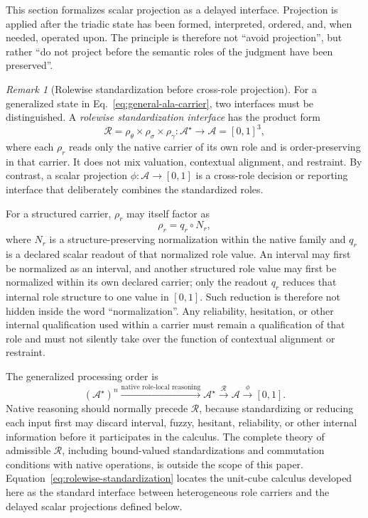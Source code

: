 \documentclass[reqno,final]{amsart}
\theoremstyle{definition}
\theoremstyle{plain}
\theoremstyle{remark}
\newtheorem{remark}{Remark}
\providecommand{\cA}{\mathcal{A}}
\begin{document}
This section formalizes scalar projection as a delayed interface. Projection is applied after the triadic state has been formed, interpreted, ordered, and, when needed, operated upon. The principle is therefore not ``avoid projection'', but rather ``do not project before the semantic roles of the judgment have been preserved''.

\begin{remark}[Rolewise standardization before cross-role projection]
\label{rem:rolewise-standardization}
For a generalized state in Eq.~\eqref{eq:general-ala-carrier}, two interfaces must be distinguished. A \emph{rolewise standardization interface} has the product form
\begin{equation}
\mathcal R
=
\rho_\theta\times\rho_\sigma\times\rho_\gamma:
\mathcal A^{\star}\longrightarrow\cA=[0,1]^3,
\label{eq:rolewise-standardization}
\end{equation}
where each \(\rho_r\) reads only the native carrier of its own role and is order-preserving in that carrier. It does not mix valuation, contextual alignment, and restraint. By contrast, a scalar projection \(\phi:\cA\to[0,1]\) is a cross-role decision or reporting interface that deliberately combines the standardized roles.

For a structured carrier, \(\rho_r\) may itself factor as
\[
\rho_r=q_r\circ N_r,
\]
where \(N_r\) is a structure-preserving normalization within the native family and \(q_r\) is a declared scalar readout of that normalized role value. An interval may first be normalized as an interval, and another structured role value may first be normalized within its own declared carrier; only the readout \(q_r\) reduces that internal role structure to one value in \([0,1]\). Such reduction is therefore not hidden inside the word ``normalization''. Any reliability, hesitation, or other internal qualification used within a carrier must remain a qualification of that role and must not silently take over the function of contextual alignment or restraint.

The generalized processing order is
\[
(\mathcal A^{\star})^n
\xrightarrow{\text{native role-local reasoning}}
\mathcal A^{\star}
\xrightarrow{\mathcal R}
\cA
\xrightarrow{\phi}
[0,1].
\]
Native reasoning should normally precede \(\mathcal R\), because standardizing or reducing each input first may discard interval, fuzzy, hesitant, reliability, or other internal information before it participates in the calculus. The complete theory of admissible \(\mathcal R\), including bound-valued standardizations and commutation conditions with native operations, is outside the scope of this paper. Equation~\eqref{eq:rolewise-standardization} locates the unit-cube calculus developed here as the standard interface between heterogeneous role carriers and the delayed scalar projections defined below.
\end{remark}
\end{document}
